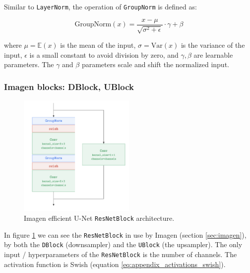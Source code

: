 Similar to \texttt{LayerNorm}, the operation of \texttt{GroupNorm} is defined as:

\begin{equation*}
    \text{GroupNorm}(x) = \frac{x - \mu}{\sqrt{\sigma^2 + \epsilon}} \cdot \gamma + \beta
\end{equation*}

where $\mu = \mathbb{E}(x)$ is the mean of the input, $\sigma = \text{Var} (x)$ is the variance of the input, $\epsilon$ is a small constant to avoid division by zero, and $\gamma, \beta$ are learnable parameters. The $\gamma$ and $\beta$ parameters scale and shift the normalized input.






\subsubsection{Imagen blocks: DBlock, UBlock}
\label{appendix:imagen}

\begin{figure}
    \centering
    \includegraphics[width=0.5\textwidth]{images/appendix/imagen/unet_resnetblock.png}
    \caption{Imagen efficient U-Net \texttt{ResNetBlock} architecture.}
    \label{fig:appendix_imagen_resnetblock}
\end{figure}

In figure \ref{fig:appendix_imagen_resnetblock} we can see the \texttt{ResNetBlock} in use by Imagen (section \ref{sec:imagen}), by both the \texttt{DBlock} (downsampler) and the \texttt{UBlock} (the upsampler). The only input / hyperparameters of the \texttt{ResNetBlock} is the number of channels. The activation function is Swish (equation \ref{eq:appendix_activations_swish}).

